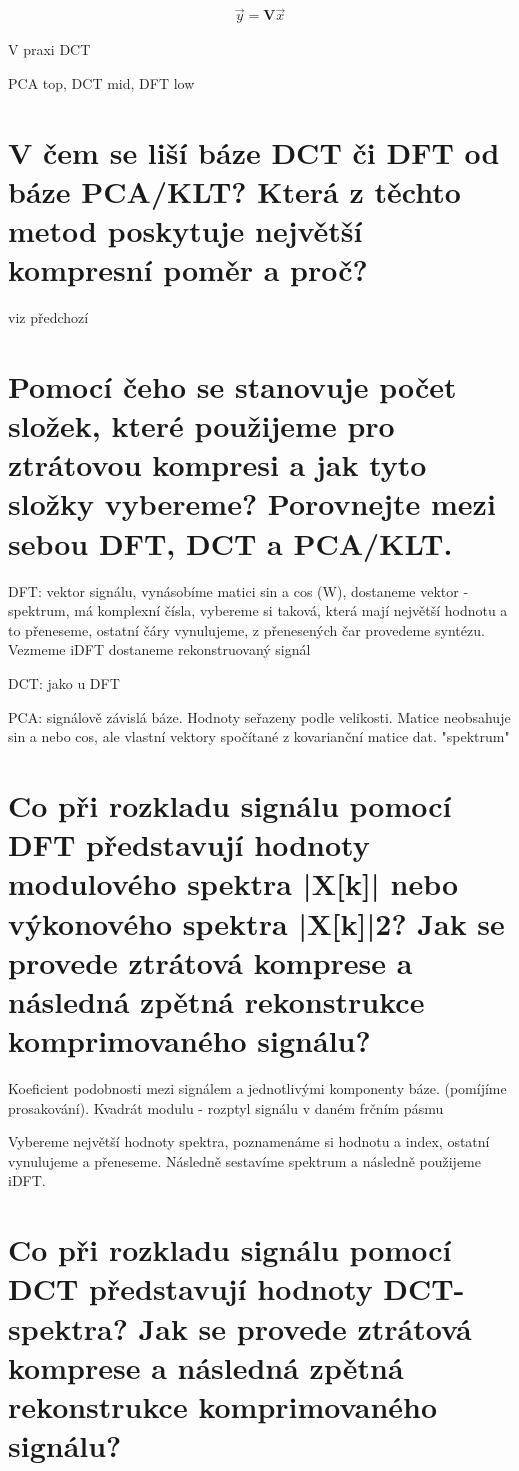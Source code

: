 \documentclass[a4paper,12pt]{article}   %
\begin{document}
\begin{align*}
        \vec{y} = \pmb V \vec{x}
\end{align*}

V praxi DCT

PCA top, DCT mid, DFT low

\section{V čem se liší báze DCT či DFT od báze PCA/KLT? Která z těchto metod poskytuje největší kompresní poměr a proč?}
viz předchozí

\section{Pomocí čeho se stanovuje počet složek, které použijeme pro ztrátovou kompresi a jak tyto složky vybereme? Porovnejte mezi sebou DFT, DCT a PCA/KLT.}
DFT: vektor signálu, vynásobíme matici sin a cos (W), dostaneme vektor - spektrum, má komplexní čísla, vybereme si taková, která mají největší hodnotu a to přeneseme, ostatní čáry vynulujeme, z přenesených čar provedeme syntézu. Vezmeme iDFT dostaneme rekonstruovaný signál

DCT: jako u DFT

PCA: signálově závislá báze. Hodnoty seřazeny podle velikosti. Matice neobsahuje sin a nebo cos, ale vlastní vektory spočítané z kovarianční matice dat. "spektrum"


\section{Co při rozkladu signálu pomocí DFT představují hodnoty modulového spektra |X[k]| nebo výkonového spektra |X[k]|2? Jak se provede ztrátová komprese a následná zpětná rekonstrukce komprimovaného signálu?}

Koeficient podobnosti mezi signálem a jednotlivými komponenty báze. (pomíjíme prosakování). Kvadrát modulu - rozptyl signálu v daném frčním pásmu

Vybereme největší hodnoty spektra, poznamenáme si hodnotu a index, ostatní vynulujeme a přeneseme. Následně sestavíme spektrum a následně použijeme iDFT.

\section{Co při rozkladu signálu pomocí DCT představují hodnoty DCT-spektra? Jak se provede ztrátová komprese a následná zpětná rekonstrukce komprimovaného signálu?}
\end{document}
